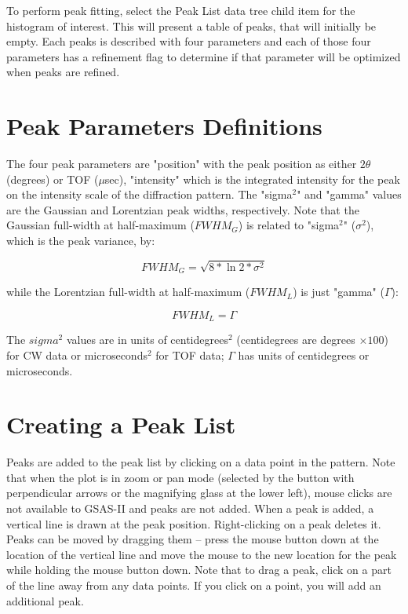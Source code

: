 To perform peak fitting, select the Peak List data tree child item for the histogram of interest. This will present a table of peaks, that will initially be empty. Each peaks is described with four parameters and each of those four parameters has a refinement flag to determine if that parameter will be optimized when peaks are refined. 

\section{Peak Parameters Definitions}\label{ref:sigmadef}

The four peak parameters are "position" with the peak position as either $2\theta$ (degrees)
or TOF ($\mu$sec), "intensity" which is the integrated intensity for the peak on the intensity scale of the diffraction pattern. The "sigma${}^2$" and "gamma" values are the Gaussian and Lorentzian peak widths, respectively. 
Note that the Gaussian full-width at half-maximum ($FWHM_G$)  is related to "sigma${}^2$" ($\sigma^2$), which is the peak variance, by: 

$$FWHM_G = \sqrt{8 * \ln 2 * \sigma^ 2}$$

while the Lorentzian full-width at half-maximum ($FWHM_L$) is just "gamma" ($\Gamma$):

$$FWHM_L = \Gamma$$

The $sigma^2$  values are in units of centidegrees$^2$ (centidegrees are degrees $\times 100$) for CW data or microseconds${}^2$ for TOF data; 
$\Gamma$ has units of centidegrees or microseconds.  

\section{Creating a Peak List}
Peaks are added to the peak list by clicking on a data point in the pattern. Note that when the plot is in zoom or pan mode (selected by the button with perpendicular arrows or the magnifying glass at the lower left), mouse clicks are not available to GSAS-II and peaks are not added. When a peak is added, a vertical line is drawn at the peak position. Right-clicking on a peak deletes it. Peaks can be moved by dragging them -- press the mouse button down at the location of  the vertical line and move the mouse to the new location for the peak while holding the mouse button down. Note that to drag a peak, click on a part of the line away from any data points. If you click on a point, you will add an additional peak. 

